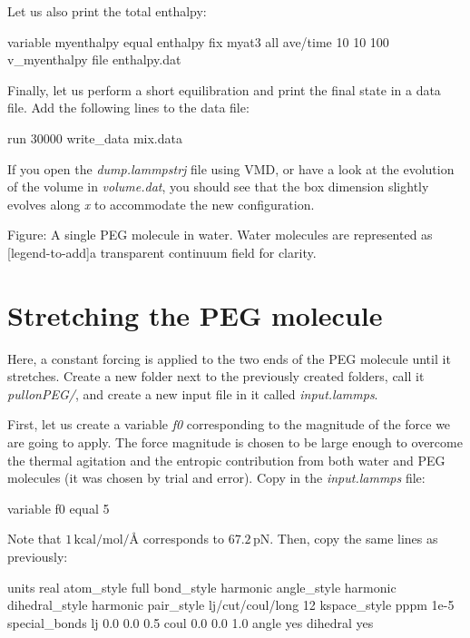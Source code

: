 \noindent Let us also print the total enthalpy:

\begin{lcverbatim}
variable myenthalpy equal enthalpy
fix myat3 all ave/time 10 10 100 v_myenthalpy file enthalpy.dat
\end{lcverbatim}

\noindent Finally, let us perform a short equilibration and print the
final state in a data file. Add the following lines to the data file:

\begin{lcverbatim}
run 30000
write_data mix.data
\end{lcverbatim}

\noindent If you open the \textit{dump.lammpstrj} file using VMD, 
or have a look at the evolution of the volume in \textit{volume.dat},
you should see that the box dimension slightly evolves along \textit{x}
to accommodate the new configuration.

\vspace{0.25cm} Figure: A single PEG molecule in water. Water molecules are represented as
[legend-to-add]a transparent continuum field for clarity.

\section{Stretching the PEG molecule}
\noindent Here, a constant forcing is applied to the two ends of the PEG molecule
until it stretches. Create a new folder next to the previously created
folders, call it \textit{pullonPEG/}, and create a new input file in it
called \textit{input.lammps}.

\vspace{0.25cm} \noindent First, let us create a variable \textit{f0} corresponding to the magnitude
of the force we are going to apply. The force magnitude is
chosen to be large enough to overcome the thermal
agitation and the entropic contribution from both water
and PEG molecules (it was chosen by trial and error). Copy
in the \textit{input.lammps} file:

\begin{lcverbatim}
variable f0 equal 5
\end{lcverbatim}

\noindent Note that $1\,\text{kcal/mol/Å}$ corresponds
to $67.2\,\text{pN}$.
Then, copy the same lines as previously:

\begin{lcverbatim}
units real
atom_style full
bond_style harmonic
angle_style harmonic
dihedral_style harmonic
pair_style lj/cut/coul/long 12
kspace_style pppm 1e-5
special_bonds lj 0.0 0.0 0.5 coul 0.0 0.0 1.0 angle yes dihedral yes
\end{lcverbatim}

